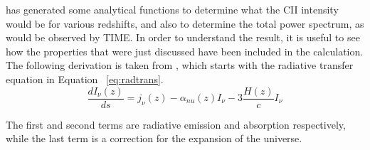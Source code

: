 \documentclass[manuscript]{aastex}
\begin{document}
\cite{Gong2012} has generated some analytical functions to determine what the CII intensity would be for various redshifts, and also to determine the total power spectrum, as would be observed by TIME. In order to understand the result, it is useful to see how the properties that were just discussed have been included in the calculation. The following derivation is taken from \cite{Gong2012}, which starts with the radiative transfer equation in Equation ~\ref{eq:radtrans}.
\begin{equation}\label{eq:radtrans}
\frac{dI_{\nu}(z)}{ds} = j_{\nu}(z) - \alpha_{nu}(z)I_{\nu} - 3 \frac{H(z)}{c}I_{\nu}
\end{equation}

The first and second terms are radiative emission and absorption respectively, while the last term is a correction for the expansion of the universe. 


\end{document}
